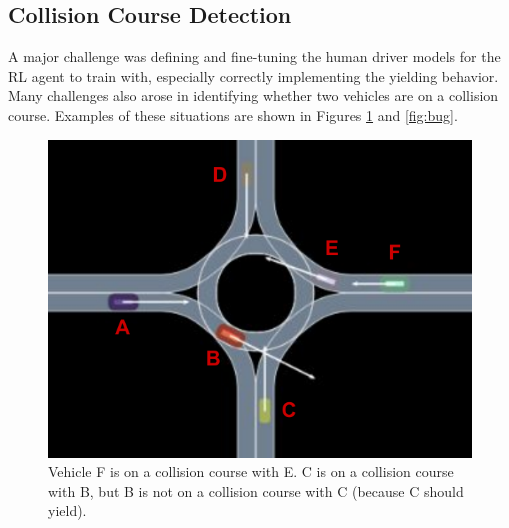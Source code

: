 \documentclass[conference]{IEEEtran}
\begin{document}
\subsection*{Collision Course Detection}
A major challenge was defining and fine-tuning the human driver models for the RL agent to train with, especially correctly implementing the yielding behavior. Many challenges also arose in identifying whether two vehicles are on a collision course. Examples of these situations are shown in Figures \ref{fig:collision} and \ref{fig:bug}.

\begin{figure}[h!]
	\centering
\includegraphics[width=0.8\linewidth]{figures/example_roundabout.pdf}
\caption{Vehicle F is on a collision course with E. C is on a collision course with B, but B is not on a collision course with C (because C should yield).}
\label{fig:collision}
\end{figure}
\end{document}
